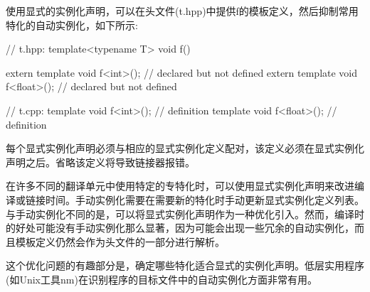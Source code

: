 使用显式的实例化声明，可以在头文件(t.hpp)中提供f的模板定义，然后抑制常用特化的自动实例化，如下所示:

\begin{cpp}
// t.hpp:
template<typename T> void f()
{ }

extern template void f<int>(); // declared but not defined
extern template void f<float>(); // declared but not defined

// t.cpp:
template void f<int>(); // definition
template void f<float>(); // definition
\end{cpp}

每个显式实例化声明必须与相应的显式实例化定义配对，该定义必须在显式实例化声明之后。省略该定义将导致链接器报错。

在许多不同的翻译单元中使用特定的专特化时，可以使用显式实例化声明来改进编译或链接时间。手动实例化需要在需要新的特化时手动更新显式实例化定义列表。与手动实例化不同的是，可以将显式实例化声明作为一种优化引入。然而，编译时的好处可能没有手动实例化那么显著，因为可能会出现一些冗余的自动实例化，而且模板定义仍然会作为头文件的一部分进行解析。

\begin{notice}这个优化问题的有趣部分是，确定哪些特化适合显式的实例化声明。低层实用程序(如Unix工具nm)在识别程序的目标文件中的自动实例化方面非常有用。
\end{notice}

















